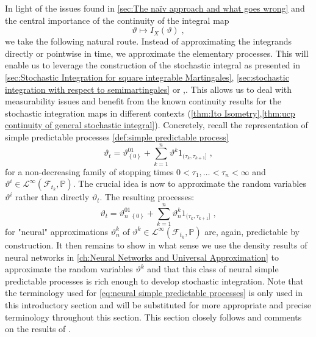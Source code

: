 \documentclass[11pt]{report}
\theoremstyle{plain} %
\theoremstyle{definition} %
\theoremstyle{remark} %
\begin{document}
 In light of the issues found in \cref{sec:The naïv approach and what goes wrong} and the central importance of the continuity of the integral map 
 \begin{equation}
     \vartheta\mapsto I_X(\vartheta)\;,
 \end{equation}
 we take the following natural route. Instead of approximating the integrands directly or pointwise in time, we approximate the elementary processes. This will enable us to leverage the construction of the stochastic integral as presented in \cref{sec:Stochastic Integration for square integrable Martingales}, \cref{sec:stochastic integration with respect to semimartingales} or \parencite{Protter2005StochasticIntegration},\parencite{CohenElliott2015StochasticCalculusApplications}. This allows us to deal with measurability issues and benefit from the known continuity results for the stochastic integration maps in different contexts (\cref{thm:Ito Isometry},\cref{thm:ucp continuity of general stochastic integral}). Concretely, recall the representation of simple predictable processes \cref{def:simple predictable process}
 \begin{equation}
     \vartheta_t = \vartheta^01_{\left\{ 0\right\}}+\sum_{k=1}^n \vartheta^k1_{(\tau_k,\tau_{k+1}]}\;,
 \end{equation}
 for a non-decreasing family of stopping times \(0<\tau_1,\dots<\tau_n<\infty\) and \(\vartheta^i\in\mathcal{L}^{\infty}(\mathcal{F}_{t_k},\mathbb{P})\). The crucial idea is now to approximate the random variables \(\vartheta^i\) rather than directly \(\vartheta_t\). The resulting processes:
 \begin{equation}\label{eq:neural simple predictable processes}
     \vartheta_t = \vartheta_n^01_{\left\{ 0\right\}}+\sum_{k=1}^n \vartheta_n^k1_{(\tau_k,\tau_{k+1}]}\;,
 \end{equation}
 for "neural" approximations \(\vartheta_n^k\) of \(\vartheta^k\in\mathcal{L}^{\infty}(\mathcal{F}_{t_k},\mathbb{P})\) are, again, predictable by construction. It then remains to show in what sense we use the density results of neural networks in \cref{ch:Neural Networks and Universal Approximation} to approximate the random variables \(\vartheta^k\) and that this class of neural simple predictable processes is rich enough to develop stochastic integration.
 Note that the terminology used for \cref{eq:neural simple predictable processes} is only used in this introductory section and will be substituted for more appropriate and precise terminology throughout this section. This section closely follows and comments on the results of \parencite[Chapter.~5]{Arandjelovic2025}.
\end{document}
